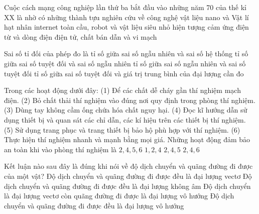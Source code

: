 \begin{ex}%
	Cuộc cách mạng công nghiệp lần thứ ba bắt đầu vào những năm 70 của thế kỉ XX là nhờ có những thành tựu nghiên cứu về
	\choice
	{công nghệ vật liệu nano và Vật lí hạt nhân}
	{internet toàn cầu, robot và vật liệu siêu nhỏ}
	{hiện tượng cảm ứng điện từ và dòng điện}
	{\True điện tử, chất bán dẫn và vi mạch}
\end{ex}

\begin{ex}%
	Sai số tỉ đối của phép đo là
	\choice
	{tỉ số giữa sai số ngẫu nhiên và sai số hệ thống}
	{tỉ số giữa sai số tuyệt đối và sai số ngẫu nhiên}
	{tỉ số giữa sai số ngẫu nhiên và sai số tuyệt đối}
	{\True tỉ số giữa sai số tuyệt đối và giá trị trung bình của đại lượng cần đo}
\end{ex}

\begin{ex}%
	Trong các hoạt động dưới đây:
	(1) Để các chất dễ cháy gần thí nghiệm mạch điện.
	(2) Bỏ chất thải thí nghiệm vào đúng nơi quy định trong phòng thí nghiệm.
	(3) Dùng tay không cầm ống chứa hóa chất nguy hại.
	(4) Đọc kĩ hướng dẫn sử dụng thiết bị và quan sát các chỉ dẫn, các kí hiệu trên các thiết bị thí nghiệm.
	(5) Sử dụng trang phục và trang thiết bị bảo hộ phù hợp với thí nghiệm.
	(6) Thực hiện thí nghiệm nhanh và mạnh bằng mọi giá.
	Những hoạt động đảm bảo an toàn khi vào phòng thí nghiệm là
	\choice
	{$2, 4, 5, 6$}
	{$1, 2, 4$}
	{\True $2, 4, 5$}
	{$2, 4, 6$}
\end{ex}

\begin{ex}%
	Kết luận nào sau đây là đúng khi nói về độ dịch chuyển và quãng đường đi được của một vật?
	\choice
	{Độ dịch chuyển và quãng đường đi được đều là đại lượng vectơ}
	{Độ dịch chuyển và quãng đường đi được đều là đại lượng không âm}
	{\True Độ dịch chuyển là đại lượng vectơ còn quãng đường đi được là đại lượng vô hướng}
	{Độ dịch chuyển và quãng đường đi được đều là đại lượng vô hướng}
\end{ex}

